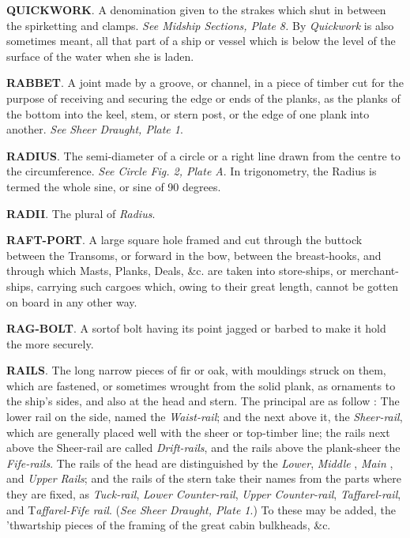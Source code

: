 \textbf{QUICKWORK}. A denomination given to the strakes which shut in between the spirketting and clamps. \textit{See Midship Sections, Plate 8.} By \textit{Quickwork} is also sometimes meant, all that part of a ship or vessel which is below the level of the surface of the water when she is laden. 

\textbf{RABBET}. A joint made by a groove, or channel, in a piece of timber cut for the purpose of receiving and securing the edge or ends of the planks, as the planks of the bottom into the keel, stem, or stern post, or the edge of one plank into another. \textit{See Sheer Draught, Plate 1}. 

\textbf{RADIUS}. The semi-diameter of a circle or a right line drawn from the centre to the circumference. \textit{See Circle Fig. 2, Plate A}. In trigonometry, the Radius is termed the whole sine, or sine of 90 degrees. 

\textbf{RADII}. The plural of \textit{Radius}. 

\textbf{RAFT-PORT}. A large square hole framed and cut through the buttock between the Transoms, or forward in the bow, between the breast-hooks, and through which Masts, Planks, Deals, \&c. are taken into store-ships, or merchant-ships, carrying such cargoes which, owing to their great length, cannot be gotten on board in any other way. 

\textbf{RAG-BOLT}. A sortof bolt having its point jagged or barbed to make it hold the more securely. 

\textbf{RAILS}. The long narrow pieces of fir or oak, with mouldings struck on them, which are fastened, or sometimes wrought from the solid plank, as ornaments to the ship's sides, and also at the head and stern. The principal are as follow : The lower rail on the side, named the \textit{Waist-rail}; and the next above it, the \textit{Sheer-rail}, which are generally placed well with the sheer or top-timber line; the rails next above the Sheer-rail are called \textit{Drift-rails}, and the rails above the plank-sheer the \textit{Fife-rails}. The rails of the head are distinguished by the \textit{Lower}, \textit{Middle} , \textit{Main} , and \textit{Upper Rails}; and the rails of the stern take their names from the parts where they are fixed, as \textit{Tuck-rail}, \textit{Lower Counter-rail}, \textit{Upper Counter-rail}, \textit{Taffarel-rail}, and T\textit{affarel-Fife rail}. (\textit{See Sheer Draught, Plate 1}.) To these may be added, the 'thwartship pieces of the framing of the great cabin bulkheads, \&c. 

